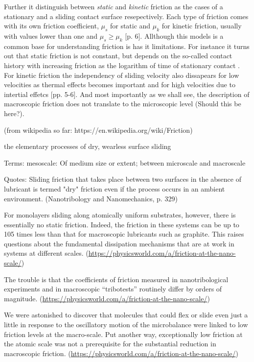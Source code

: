Further it distinguish between \textit{static} and \textit{kinetic} friction as the cases of a stationary and a sliding contact surface resepectively. Each type of friction comes with its own friction coefficient, $\mu_s$ for static and $\mu_k$ for kinetic friction, usually with values lower than one and $\mu_s \ge \mu_k$ \cite{gnecco_meyer_2015}[p. 6]. Allthough this models is a common base for understanding friction is has it limitations. For instance it turns out that static friction is not constant, but depends on the so-called contact history with increasing friction as the logarithm of time of stationary contact \cite{dieterich_1972}. For kinetic friction the independency of sliding velocity also dissapears for low velocities as thermal effects becomes important and for high velocities due to intertial effetcs \cite{gnecco_meyer_2015}[pp. 5-6]. And most importantly as we shall see, the description of macroscopic friction does not translate to the microscopic level (Should this be here?). 


\newpage


(from wikipedia so far: https://en.wikipedia.org/wiki/Friction)

the elementary processes of dry, wearless surface sliding 

Terms:
mesoscale: Of medium size or extent; between microscale and macroscale

Quotes:
Sliding friction that takes place between two surfaces in the absence of lubricant is termed "dry" friction even if the process occurs in an ambient environment. (Nanotribology and Nanomechanics, p. 329)


For monolayers sliding along atomically uniform substrates, however, there is essentially no static friction. Indeed, the friction in these systems can be up to 105 times less than that for macroscopic lubricants such as graphite. This raises questions about the fundamental dissipation mechanisms that are at work in systems at different scales. (\url{https://physicsworld.com/a/friction-at-the-nano-scale/})

The trouble is that the coefficients of friction measured in nanotribological experiments and in macroscopic “tribotests” routinely differ by orders of magnitude. (\url{https://physicsworld.com/a/friction-at-the-nano-scale/})

We were astonished to discover that molecules that could flex or slide even just a little in response to the oscillatory motion of the microbalance were linked to low friction levels at the macro-scale. Put another way, exceptionally low friction at the atomic scale was not a prerequisite for the substantial reduction in macroscopic friction. (\url{https://physicsworld.com/a/friction-at-the-nano-scale/})


